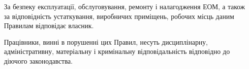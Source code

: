 \documentclass[simple,a4paper,14pt,ukrainian,utf8]{eskdtext}
\begin{document}
\begin{appendices}
                За безпеку експлуатації, обслуговування, ремонту і налагодження ЕОМ, а також за відповідність устаткування, виробничих приміщень, робочих місць даним Правилам відповідає власник.

                Працівники, винні в порушенні цих Правил, несуть дисциплінарну, адміністративну, матеріальну і кримінальну відповідальність відповідно до діючого законодавства.

    \end{appendices}

\newpage


\renewcommand\bibname{Використана література}

\end{document}
